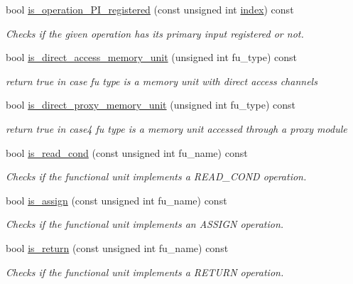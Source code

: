 \begin{DoxyCompactItemize}
bool \hyperlink{classAllocationInformation_a5b773433e8ccb2c3517df0b7cec41f26}{is\+\_\+operation\+\_\+\+P\+I\+\_\+registered} (const unsigned int \hyperlink{tutorial__pact__2019_2Introduction_2third_2include_2Keccak_8h_a028c9bdc8344cca38ab522a337074797}{index}) const
\begin{DoxyCompactList}\small\item\em Checks if the given operation has its primary input registered or not. \end{DoxyCompactList}\item 
bool \hyperlink{classAllocationInformation_a1950658762d7b1febe0131924202ae36}{is\+\_\+direct\+\_\+access\+\_\+memory\+\_\+unit} (unsigned int fu\+\_\+type) const
\begin{DoxyCompactList}\small\item\em return true in case fu type is a memory unit with direct access channels \end{DoxyCompactList}\item 
bool \hyperlink{classAllocationInformation_a7318ac7290c6ddc8f871c98d8817c5c9}{is\+\_\+direct\+\_\+proxy\+\_\+memory\+\_\+unit} (unsigned int fu\+\_\+type) const
\begin{DoxyCompactList}\small\item\em return true in case4 fu type is a memory unit accessed through a proxy module \end{DoxyCompactList}\item 
bool \hyperlink{classAllocationInformation_ace7726c3d3d4f4115a8c38a7a4f5aa9c}{is\+\_\+read\+\_\+cond} (const unsigned int fu\+\_\+name) const
\begin{DoxyCompactList}\small\item\em Checks if the functional unit implements a R\+E\+A\+D\+\_\+\+C\+O\+ND operation. \end{DoxyCompactList}\item 
bool \hyperlink{classAllocationInformation_a2989fe891888c7cbf2827061e22143dc}{is\+\_\+assign} (const unsigned int fu\+\_\+name) const
\begin{DoxyCompactList}\small\item\em Checks if the functional unit implements an A\+S\+S\+I\+GN operation. \end{DoxyCompactList}\item 
bool \hyperlink{classAllocationInformation_a591cf1df78a6a6a8261906316a9185a4}{is\+\_\+return} (const unsigned int fu\+\_\+name) const
\begin{DoxyCompactList}\small\item\em Checks if the functional unit implements a R\+E\+T\+U\+RN operation. \end{DoxyCompactList}\item 

\end{DoxyCompactItemize}
